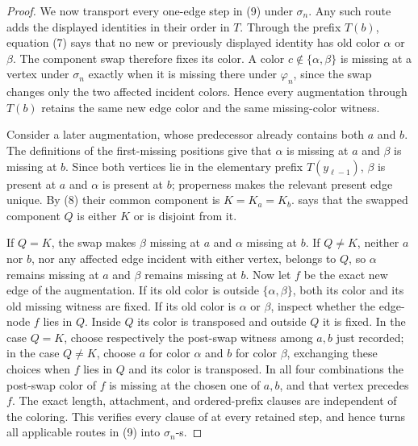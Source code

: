 \begin{proof}
We now transport every one-edge step in (9) under $\sigma_n$.  Any such
route adds the displayed identities in their order in $T$.  Through the
prefix $T(b)$, equation (7) says that no new or previously displayed
identity has old color $\alpha$ or $\beta$.  The component swap therefore
fixes its color.  A color $c\notin\{\alpha,\beta\}$ is missing at a
vertex under $\sigma_n$ exactly when it is missing there under
$\varphi_n$, since the swap changes only the two affected incident
colors.  Hence every augmentation through $T(b)$ retains the same new
edge color and the same missing-color witness.

Consider a later augmentation, whose predecessor already contains both
$a$ and $b$.  The definitions of the first-missing positions give that
$\alpha$ is missing at $a$ and $\beta$ is missing at $b$.  Since both
vertices lie in the elementary prefix $T(y_{\ell-1})$, $\beta$ is present at
$a$ and $\alpha$ is present at $b$; properness makes the relevant present
edge unique.  By (8) their common component is $K=K_a=K_b$.
 says that the swapped component $Q$
is either $K$ or is disjoint from it.

If $Q=K$, the swap makes $\beta$ missing at $a$ and $\alpha$ missing at
$b$.  If $Q\ne K$, neither $a$ nor $b$, nor any affected edge incident
with either vertex, belongs to $Q$, so $\alpha$ remains missing at $a$
and $\beta$ remains missing at $b$.  Now let $f$ be the exact new edge of
the augmentation.  If its old color is outside
$\{\alpha,\beta\}$, both its color and its old missing witness are fixed.
If its old color is $\alpha$ or $\beta$, inspect whether the edge-node
$f$ lies in $Q$.  Inside $Q$ its color is transposed and outside $Q$ it
is fixed.  In the case $Q=K$, choose respectively the post-swap witness
among $a,b$ just recorded; in the case $Q\ne K$, choose $a$ for color
$\alpha$ and $b$ for color $\beta$, exchanging these choices when $f$
lies in $Q$ and its color is transposed.  In all four combinations the
post-swap color of $f$ is missing at the chosen one of $a,b$, and that
vertex precedes $f$.  The exact length, attachment, and ordered-prefix
clauses are independent of the coloring.  This verifies every clause of
 at every retained step, and hence turns
all applicable routes in (9) into
$\sigma_n$-s.             


\end{proof}

